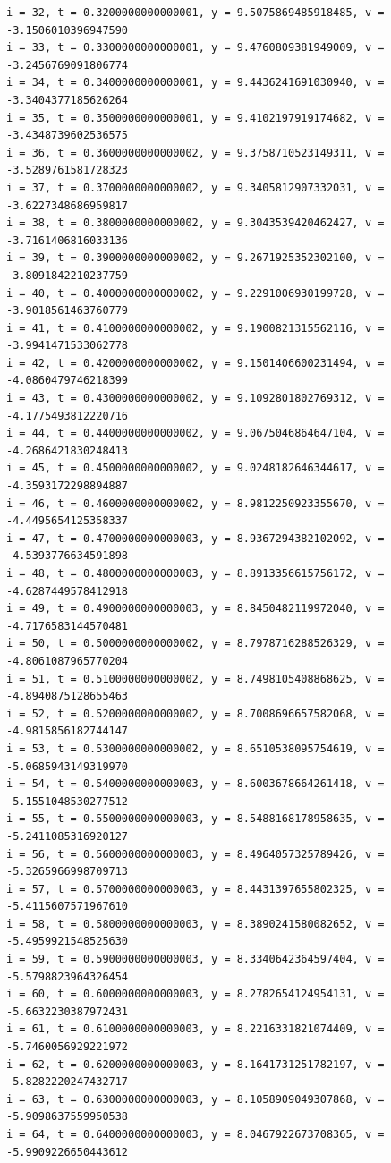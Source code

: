 \documentclass[a4j,titlepage]{jsarticle}
\begin{document}
\begin{lstlisting}[style=text,caption=課題7の実行結果,label=lst:kekka7]
i = 32, t = 0.3200000000000001, y = 9.5075869485918485, v = -3.1506010396947590
i = 33, t = 0.3300000000000001, y = 9.4760809381949009, v = -3.2456769091806774
i = 34, t = 0.3400000000000001, y = 9.4436241691030940, v = -3.3404377185626264
i = 35, t = 0.3500000000000001, y = 9.4102197919174682, v = -3.4348739602536575
i = 36, t = 0.3600000000000002, y = 9.3758710523149311, v = -3.5289761581728323
i = 37, t = 0.3700000000000002, y = 9.3405812907332031, v = -3.6227348686959817
i = 38, t = 0.3800000000000002, y = 9.3043539420462427, v = -3.7161406816033136
i = 39, t = 0.3900000000000002, y = 9.2671925352302100, v = -3.8091842210237759
i = 40, t = 0.4000000000000002, y = 9.2291006930199728, v = -3.9018561463760779
i = 41, t = 0.4100000000000002, y = 9.1900821315562116, v = -3.9941471533062778
i = 42, t = 0.4200000000000002, y = 9.1501406600231494, v = -4.0860479746218399
i = 43, t = 0.4300000000000002, y = 9.1092801802769312, v = -4.1775493812220716
i = 44, t = 0.4400000000000002, y = 9.0675046864647104, v = -4.2686421830248413
i = 45, t = 0.4500000000000002, y = 9.0248182646344617, v = -4.3593172298894887
i = 46, t = 0.4600000000000002, y = 8.9812250923355670, v = -4.4495654125358337
i = 47, t = 0.4700000000000003, y = 8.9367294382102092, v = -4.5393776634591898
i = 48, t = 0.4800000000000003, y = 8.8913356615756172, v = -4.6287449578412918
i = 49, t = 0.4900000000000003, y = 8.8450482119972040, v = -4.7176583144570481
i = 50, t = 0.5000000000000002, y = 8.7978716288526329, v = -4.8061087965770204
i = 51, t = 0.5100000000000002, y = 8.7498105408868625, v = -4.8940875128655463
i = 52, t = 0.5200000000000002, y = 8.7008696657582068, v = -4.9815856182744147
i = 53, t = 0.5300000000000002, y = 8.6510538095754619, v = -5.0685943149319970
i = 54, t = 0.5400000000000003, y = 8.6003678664261418, v = -5.1551048530277512
i = 55, t = 0.5500000000000003, y = 8.5488168178958635, v = -5.2411085316920127
i = 56, t = 0.5600000000000003, y = 8.4964057325789426, v = -5.3265966998709713
i = 57, t = 0.5700000000000003, y = 8.4431397655802325, v = -5.4115607571967610
i = 58, t = 0.5800000000000003, y = 8.3890241580082652, v = -5.4959921548525630
i = 59, t = 0.5900000000000003, y = 8.3340642364597404, v = -5.5798823964326454
i = 60, t = 0.6000000000000003, y = 8.2782654124954131, v = -5.6632230387972431
i = 61, t = 0.6100000000000003, y = 8.2216331821074409, v = -5.7460056929221972
i = 62, t = 0.6200000000000003, y = 8.1641731251782197, v = -5.8282220247432717
i = 63, t = 0.6300000000000003, y = 8.1058909049307868, v = -5.9098637559950538
i = 64, t = 0.6400000000000003, y = 8.0467922673708365, v = -5.9909226650443612

\end{lstlisting}
\end{document}
